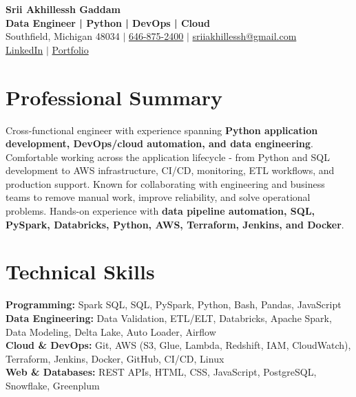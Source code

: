 \documentclass[letterpaper,10pt]{article}
\begin{document}
\fontsize{9.35pt}{10.45pt}\selectfont

\begin{center}
    {\LARGE \textbf{Srii Akhillessh Gaddam}} \\[-1pt]
    \textbf{Data Engineer | Python | DevOps | Cloud} \\[2pt]
    Southfield, Michigan 48034 $|$
    \href{tel:6468752400}{646-875-2400} $|$
    \href{mailto:sriiakhillessh@gmail.com}{sriiakhillessh@gmail.com} \\[1pt]
    \href{https://www.linkedin.com/in/srii-akhiilessh-gaddam-b48668191/}{LinkedIn} $|$
    \href{https://sriiakhillesshg.github.io/portfolio/}{Portfolio}
\end{center}
\vspace{-8pt}

\section{Professional Summary}
\small{Cross-functional engineer with experience spanning \textbf{Python application development, DevOps/cloud automation, and data engineering}. Comfortable working across the application lifecycle - from Python and SQL development to AWS infrastructure, CI/CD, monitoring, ETL workflows, and production support. Known for collaborating with engineering and business teams to remove manual work, improve reliability, and solve operational problems. Hands-on experience with \textbf{data pipeline automation, SQL, PySpark, Databricks, Python, AWS, Terraform, Jenkins, and Docker}.}

\section{Technical Skills}
\small{
\textbf{Programming:} Spark SQL, SQL, PySpark, Python, Bash, Pandas, JavaScript \\
\textbf{Data Engineering:} Data Validation, ETL/ELT, Databricks, Apache Spark, Data Modeling, Delta Lake, Auto Loader, Airflow \\
\textbf{Cloud \& DevOps:} Git, AWS (S3, Glue, Lambda, Redshift, IAM, CloudWatch), Terraform, Jenkins, Docker, GitHub, CI/CD, Linux \\
\textbf{Web \& Databases:} REST APIs, HTML, CSS, JavaScript, PostgreSQL, Snowflake, Greenplum
}

\end{document}
